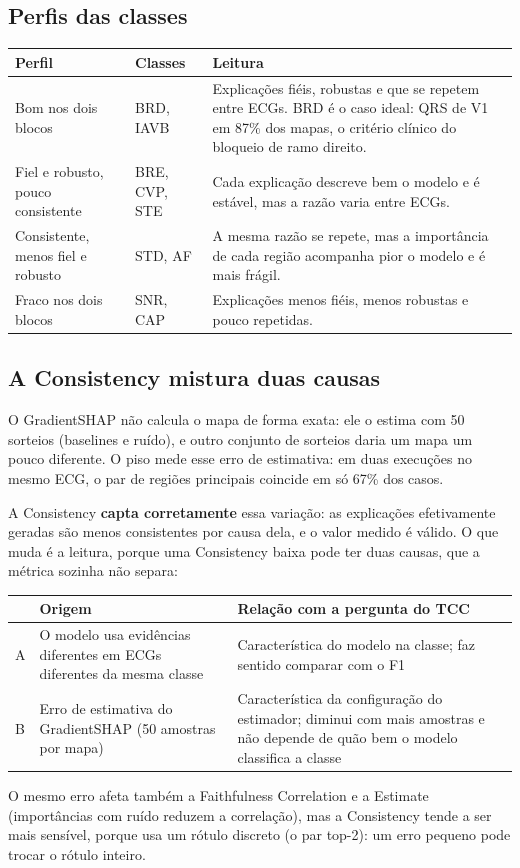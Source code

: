 \documentclass[11pt,a4paper]{article}
\begin{document}
\subsection{Perfis das classes}
\begin{table}[H]
\centering
\small
\begin{tabularx}{\textwidth}{llX}
\toprule
\textbf{Perfil} & \textbf{Classes} & \textbf{Leitura} \\
\midrule
Bom nos dois blocos & BRD, IAVB & Explicações fiéis, robustas e que se repetem entre ECGs. BRD é o caso ideal: QRS de V1 em 87\% dos mapas, o critério clínico do bloqueio de ramo direito. \\
\addlinespace
Fiel e robusto, pouco consistente & BRE, CVP, STE & Cada explicação descreve bem o modelo e é estável, mas a razão varia entre ECGs. \\
\addlinespace
Consistente, menos fiel e robusto & STD, AF & A mesma razão se repete, mas a importância de cada região acompanha pior o modelo e é mais frágil. \\
\addlinespace
Fraco nos dois blocos & SNR, CAP & Explicações menos fiéis, menos robustas e pouco repetidas. \\
\bottomrule
\end{tabularx}
\end{table}

\subsection{A Consistency mistura duas causas}
O GradientSHAP não calcula o mapa de forma exata: ele o estima com 50 sorteios (baselines e ruído), e outro conjunto de sorteios daria um mapa um pouco diferente. O piso mede esse erro de estimativa: em duas execuções no mesmo ECG, o par de regiões principais coincide em só 67\% dos casos.

A Consistency \textbf{capta corretamente} essa variação: as explicações efetivamente geradas são menos consistentes por causa dela, e o valor medido é válido. O que muda é a leitura, porque uma Consistency baixa pode ter duas causas, que a métrica sozinha não separa:
\begin{center}\small
\begin{tabularx}{\linewidth}{lXX}
\toprule
& \textbf{Origem} & \textbf{Relação com a pergunta do TCC} \\
\midrule
A & O modelo usa evidências diferentes em ECGs diferentes da mesma classe & Característica do modelo na classe; faz sentido comparar com o F1 \\ \addlinespace
B & Erro de estimativa do GradientSHAP (50 amostras por mapa) & Característica da configuração do estimador; diminui com mais amostras e não depende de quão bem o modelo classifica a classe \\
\bottomrule
\end{tabularx}
\end{center}
O mesmo erro afeta também a Faithfulness Correlation e a Estimate (importâncias com ruído reduzem a correlação), mas a Consistency tende a ser mais sensível, porque usa um rótulo discreto (o par top-2): um erro pequeno pode trocar o rótulo inteiro.
\end{document}
